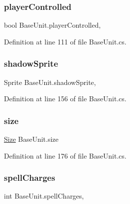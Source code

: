 \subsubsection{\texorpdfstring{playerControlled}{playerControlled}}
{\footnotesize\ttfamily bool Base\+Unit.\+player\+Controlled\hspace{0.3cm}{\ttfamily [get]}, {\ttfamily [set]}}



Definition at line 111 of file Base\+Unit.\+cs.

\mbox{\label{class_base_unit_a1358f64f26574f3c4e0b3bee74da3a1c}} 
\subsubsection{\texorpdfstring{shadowSprite}{shadowSprite}}
{\footnotesize\ttfamily Sprite Base\+Unit.\+shadow\+Sprite\hspace{0.3cm}{\ttfamily [get]}, {\ttfamily [set]}}



Definition at line 156 of file Base\+Unit.\+cs.

\mbox{\label{class_base_unit_abbd0722704197f42acd5ea6b3ce0360b}} 
\subsubsection{\texorpdfstring{size}{size}}
{\footnotesize\ttfamily \mbox{\hyperlink{class_base_unit_a4c855b587a2eecd744c4c511aeda7da1}{Size}} Base\+Unit.\+size\hspace{0.3cm}{\ttfamily [get]}}



Definition at line 176 of file Base\+Unit.\+cs.

\mbox{\label{class_base_unit_a5efaee783f7a5504f36b62949634660a}} 
\subsubsection{\texorpdfstring{spellCharges}{spellCharges}}
{\footnotesize\ttfamily int Base\+Unit.\+spell\+Charges\hspace{0.3cm}{\ttfamily [get]}, {\ttfamily [set]}}



